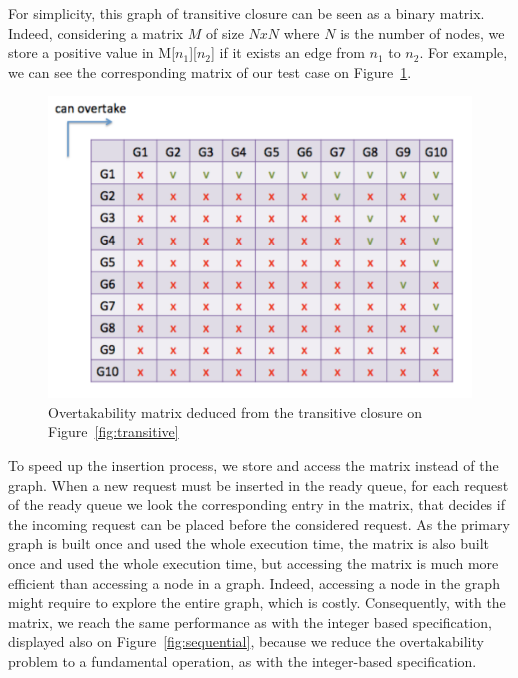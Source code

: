 \documentclass[11pt]{report}
\begin{document}
For simplicity, this graph of transitive closure can be seen as a binary matrix. Indeed, considering a matrix $M$ of size $NxN$ where $N$ is the number of nodes, we store a positive value in M[$n_1$][$n_2$] if it exists an edge from $n_1$ to $n_2$. For example, we can see the corresponding matrix of our test case on Figure~\ref{fig:matrix}.
\begin{figure}[!ht]
      \begin{minipage}[c]{\textwidth}
      \centering
      \includegraphics[scale=0.5]{pictures/matrix.pdf}
      \end{minipage}
      \caption{Overtakability matrix deduced from the transitive closure on Figure~\ref{fig:transitive}}
      \label{fig:matrix} 
\end{figure}
To speed up the insertion process, we store and access the matrix instead of the graph. When a new request must be inserted in the ready queue, for each request of the ready queue we look the corresponding entry in the matrix, that decides if the incoming request can be placed before the considered request. 
As the primary graph is built once and used the whole execution time, the matrix is also built once and used the whole execution time, but accessing the matrix is much more efficient than accessing a node in a graph. Indeed, accessing a node in the graph might require to explore the entire graph, which is costly.
Consequently, with the matrix, we reach the same performance as with the integer based specification, displayed also on Figure~\ref{fig:sequential}, because we reduce the overtakability problem to a fundamental operation, as with the integer-based specification.
\end{document}
